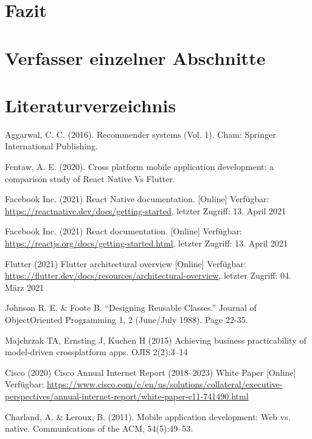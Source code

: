 \documentclass[11pt,a4paper]{article}
\begin{document}
\clearpage
\section{Fazit}
\label{sec:fazit}



\clearpage
\appendix
\section{Verfasser einzelner Abschnitte}



\clearpage
\section*{Literaturverzeichnis}
\begin{itemize}
	 Aggarwal, C. C. (2016). Recommender systems (Vol. 1). Cham: Springer International Publishing.

	 Fentaw, A. E. (2020). Cross platform mobile application development: a comparison study of React Native Vs Flutter.

	 Facebook Inc. (2021) React Native documentation. [Online] Verfügbar: \url{https://reactnative.dev/docs/getting-started}, letzter Zugriff: 13. April 2021

	 Facebook Inc. (2021) React documentation. [Online] Verfügbar: \url{https://reactjs.org/docs/getting-started.html}, letzter Zugriff: 13. April 2021

	 Flutter (2021) Flutter architectural overview [Online] Verfügbar: \url{https://flutter.dev/docs/resources/architectural-overview}, letzter Zugriff: 04. März 2021

	 Johnson R. E. \&  Foote B. “Designing Reusable Classes.” Journal of ObjectOriented Programming 1, 2 (June/July 1988). Page 22-35.

	 Majchrzak TA, Ernsting J, Kuchen H (2015) Achieving business practicability of model-driven crossplatform apps. OJIS 2(2):3–14

	 Cisco (2020) Cisco Annual Internet Report (2018–2023) White Paper [Online] Verfügbar: \url{https://www.cisco.com/c/en/us/solutions/collateral/executive-perspectives/annual-internet-report/white-paper-c11-741490.html}

	 Charland, A. \& Leroux, B. (2011). Mobile application development: Web vs. native. Communications of the ACM, 54(5):49–53.


\end{itemize}
\end{document}
